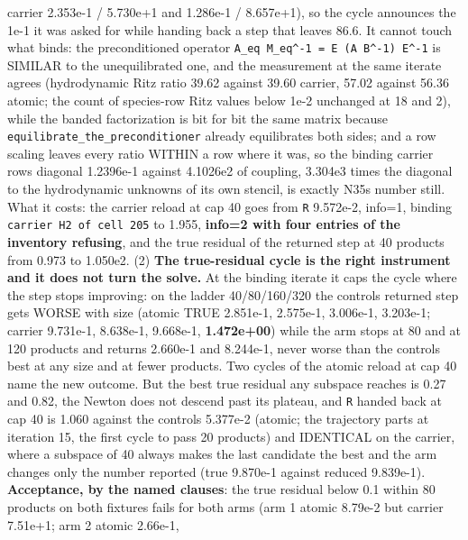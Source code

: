 \documentclass[english,a4paper]{my_memo}
\begin{document}
\begin{itemize}
  carrier 2.353e-1 / 5.730e+1 and 1.286e-1 / 8.657e+1), so the cycle
  announces the 1e-1 it was asked for while handing back a step that
  leaves 86.6. It cannot touch what binds: the preconditioned operator
  \texttt{A\_eq\ M\_eq\^{}-1\ =\ E\ (A\ B\^{}-1)\ E\^{}-1} is SIMILAR to the unequilibrated one,
  and the measurement at the same iterate agrees (hydrodynamic Ritz ratio
  39.62 against 39.60 carrier, 57.02 against 56.36 atomic; the count of
  species-row Ritz values below 1e-2 unchanged at 18 and 2), while the
  banded factorization is bit for bit the same matrix because
  \texttt{equilibrate\_the\_preconditioner} already equilibrates both sides; and a
  row scaling leaves every ratio WITHIN a row where it was, so the binding
  carrier row\textquotesingle s diagonal 1.2396e-1 against 4.1026e2 of coupling, 3.304e3
  times the diagonal to the hydrodynamic unknowns of its own stencil, is
  exactly N35\textquotesingle s number still. What it costs: the carrier reload at cap 40
  goes from \texttt{\textbar{}\textbar{}R\textbar{}\textbar{}} 9.572e-2, info=1, binding \texttt{carrier\ H2\ of\ cell\ 205} to
  1.955, \textbf{info=2 with four entries of the inventory refusing}, and the
  true residual of the returned step at 40 products from 0.973 to 1.050e2.
  (2) \textbf{The true-residual cycle is the right instrument and it does not
  turn the solve.} At the binding iterate it caps the cycle where the
  step stops improving: on the ladder 40/80/160/320 the control\textquotesingle s returned
  step gets WORSE with size (atomic TRUE 2.851e-1, 2.575e-1, 3.006e-1,
  3.203e-1; carrier 9.731e-1, 8.638e-1, 9.668e-1, \textbf{1.472e+00}) while the
  arm stops at 80 and at 120 products and returns 2.660e-1 and 8.244e-1,
  never worse than the control\textquotesingle s best at any size and at fewer products.
  Two cycles of the atomic reload at cap 40 name the new outcome. But the
  best true residual any subspace reaches is 0.27 and 0.82, the Newton
  does not descend past its plateau, and \texttt{\textbar{}\textbar{}R\textbar{}\textbar{}} handed back at cap 40 is
  1.060 against the control\textquotesingle s 5.377e-2 (atomic; the trajectory parts at
  iteration 15, the first cycle to pass 20 products) and IDENTICAL on the
  carrier, where a subspace of 40 always makes the last candidate the best
  and the arm changes only the number reported (true 9.870e-1 against
  reduced 9.839e-1). \textbf{Acceptance, by the named clauses}: the true
  residual below 0.1 within 80 products on both fixtures fails for both
  arms (arm 1 atomic 8.79e-2 but carrier 7.51e+1; arm 2 atomic 2.66e-1,

\end{itemize}
\end{document}
